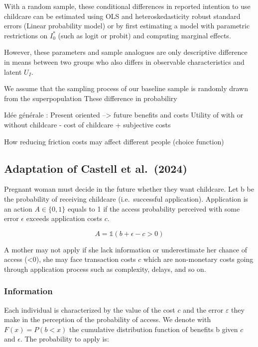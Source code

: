 \documentclass[
]{article}
\newcommand{\one}[1]{\mathds{1}( #1 )}
\begin{document}
With a random sample, these conditional differences in reported intention to use childcare can be estimated using OLS and heteroskedasticity robust standard errors (Linear probability model) or by first estimating a model with parametric restrictions on \(I_0^*\) (such as logit or probit) and computing marginal effects.

However, these parameters and sample analogues are only descriptive difference in means between two groups who also differs in observable characteristics and latent \(U_I\).

We assume that the sampling process of our baseline sample is randomly drawn from the superpopulation
These difference in probabiliry

Idée générale :
Present oriented --\textgreater{} future benefits and costs
Utility of with or without childcare - cost of childcare + subjective costs

How reducing friction costs may affect different people (choice function)

\subsection{Adaptation of Castell et al.~(2024)}\label{adaptation-of-castell-et-al.-2024}

Pregnant woman must decide in the future whether they want childcare. Let b be the probability of receiving childcare (i.e.~successful application).
Application is an action \(A \in \{0,1\}\) equals to 1 if the access probability perceived with some error \(\epsilon\) exceeds application costs \(c\).

\begin{equation}
A =\one{b+\epsilon-c>0}
\end{equation}

A mother may not apply if she lack information or underestimate her chance of access (\epsilon\textless0), she may face transaction costs \(c\) which are non-monetary costs going through application process such as complexity, delays, and so on.

\subsubsection{Information}\label{information}

Each individual is characterized by the value of the cost \(c\) and the error \(ε\) they make in the perception of the probability of access. We denote with \(F (x) = P (b < x)\) the cumulative distribution function of benefits b given \(c\) and \(\epsilon\). The probability to apply is:
\end{document}
